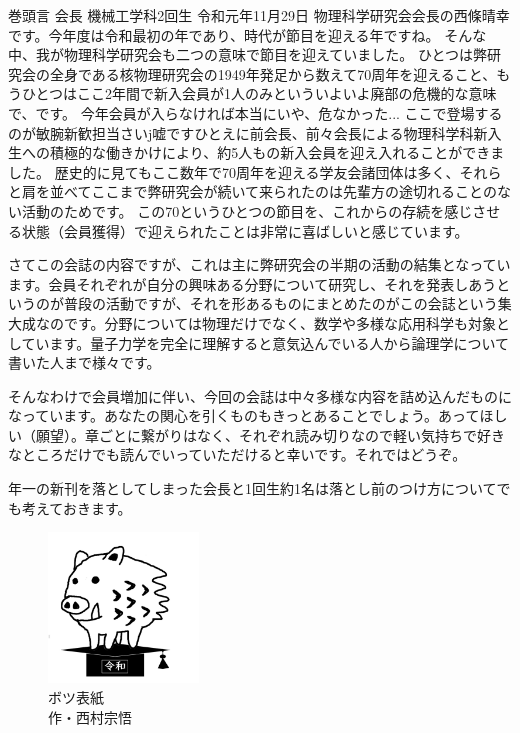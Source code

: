 \documentclass[10pt,b5paper,papersize,dvipdfmx]{jsbook}
\begin{document}
\begin{preface}{巻頭言}
        {会長}%
        {機械工学科2回生}%
        {}%
        {令和元年11月29日}%
  物理科学研究会会長の西條晴幸です。今年度は令和最初の年であり、時代が節目を迎える年ですね。
  そんな中、我が物理科学研究会も二つの意味で節目を迎えていました。
  ひとつは弊研究会の全身である核物理研究会の1949年発足から数えて70周年を迎えること、もうひとつはここ2年間で新入会員が1人のみといういよいよ廃部の危機的な意味で、です。
  今年会員が入らなければ本当にいや、危なかった...
  ここで登場するのが敏腕新歓担当さいj嘘ですひとえに前会長、前々会長による物理科学科新入生への積極的な働きかけにより、約5人もの新入会員を迎え入れることができました。
  歴史的に見てもここ数年で70周年を迎える学友会諸団体は多く、それらと肩を並べてここまで弊研究会が続いて来られたのは先輩方の途切れることのない活動のためです。
  この70というひとつの節目を、これからの存続を感じさせる状態（会員獲得）で迎えられたことは非常に喜ばしいと感じています。\par
  さてこの会誌の内容ですが、これは主に弊研究会の半期の活動の結集となっています。会員それぞれが自分の興味ある分野について研究し、それを発表しあうというのが普段の活動ですが、それを形あるものにまとめたのがこの会誌という集大成なのです。分野については物理だけでなく、数学や多様な応用科学も対象としています。量子力学を完全に理解すると意気込んでいる人から論理学について書いた人まで様々です。\par
  そんなわけで会員増加に伴い、今回の会誌は中々多様な内容を詰め込んだものになっています。あなたの関心を引くものもきっとあることでしょう。あってほしい（願望）。章ごとに繋がりはなく、それぞれ読み切りなので軽い気持ちで好きなところだけでも読んでいっていただけると幸いです。それではどうぞ。\par
  年一の新刊を落としてしまった会長と1回生約1名は落とし前のつけ方についてでも考えておきます。
\end{preface}


\clearpage
\quad\vfill
\begin{figure}[htb]
  \centering
  \includegraphics[width=40mm]{img/inoshishi.png}
  \caption*{
    \setlength{\baselineskip}{1.2zw}\gtfamily
    ボツ表紙 \\ 作・西村宗悟
  }
\end{figure}
\vfill
\end{document}
